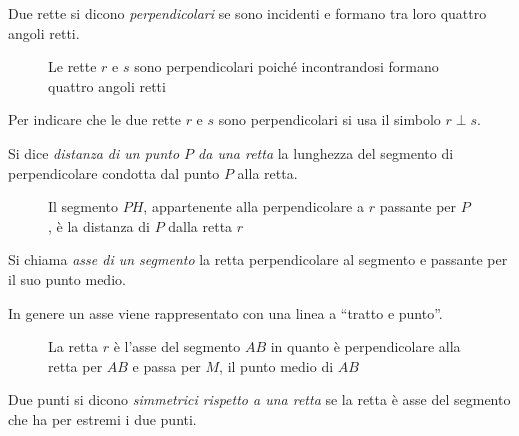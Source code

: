 \begin{definizione}
Due rette si dicono \emph{perpendicolari} se sono incidenti e formano 
tra loro quattro angoli retti.
\end{definizione}


\begin{inaccessibleblock}
 \begin{figure}[htb]
\centering
\caption{Le rette \(r\) e \(s\) sono perpendicolari poiché incontrandosi 
formano quattro angoli retti}
\end{figure}
\end{inaccessibleblock}

Per indicare che le due rette \(r\) e \(s\) sono perpendicolari si usa il 
simbolo \(r\perp s\).

\begin{definizione}
Si dice \emph{distanza di un punto \(P\) da una retta} la lunghezza del 
segmento di perpendicolare condotta dal punto \(P\) alla retta.
\end{definizione}


\begin{inaccessibleblock}
 \begin{figure}[htb]
\centering
\caption{Il segmento \(PH\), appartenente alla perpendicolare a \(r\) 
passante per \(P\), è la distanza di \(P\) dalla retta \(r\)}
\end{figure}
\end{inaccessibleblock}

\begin{definizione}\label{def:asse_segmento}
Si chiama \emph{asse di un segmento} la retta perpendicolare al 
segmento e passante per il suo punto medio.
\end{definizione}

In genere un asse viene rappresentato con una linea a ``tratto e 
punto''.


\begin{inaccessibleblock}
 \begin{figure}[htb]
\centering
\caption{La retta \(r\) è l'asse del segmento \(AB\) in quanto è 
perpendicolare alla retta per \(AB\) e passa per \(M\), il punto medio di 
\(AB\)}\label{fig:1.38}
\end{figure}
\end{inaccessibleblock}

\begin{definizione}
Due punti si dicono \emph{simmetrici rispetto a una retta} se la 
retta è asse del segmento che ha per estremi i due punti.
\end{definizione}

